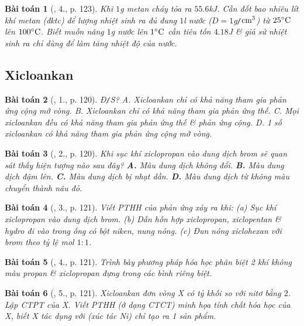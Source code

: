 \documentclass{article}
\newtheorem{baitoan}{Bài toán}
\begin{document}
\begin{baitoan}[\cite{SGK_Hoa_Hoc_11_co_ban}, 4., p. 123]
	Khi $1$\emph{g} metan cháy tỏa ra $55.6$\emph{kJ}. Cần đốt bao nhiêu lít khí metan (đktc) để lượng nhiệt sinh ra đủ đung $1$\emph{l} nước ($D = 1$\emph{g\texttt{/}$\rm cm^3$}) từ $25^\circ{\rm C}$ lên $100^\circ{\rm C}$. Biết muốn nâng $1$\emph{g} nước lên $1^\circ{\rm C}$ cần tiêu tốn $4.18$\emph{J} \& giả sử nhiệt sinh ra chỉ dùng để làm tăng nhiệt độ của nước.
\end{baitoan}


\subsection{Xicloankan}

\begin{baitoan}[\cite{SGK_Hoa_Hoc_11_co_ban}, 1., p. 120]
	\emph{Đ\texttt{/}S}? {\sf A.} Xicloankan chỉ có khả năng tham gia phản ứng cộng mở vòng. {\sf B.} Xicloankan chỉ có khả năng tham gia phản ứng thế. {\sf C.} Mọi xicloankan đều có khả năng tham gia phản ứng thế \& phản ứng cộng. {\sf D.} 1 số xicloankan có khả năng tham gia phản ứng cộng mở vòng.
\end{baitoan}

\begin{baitoan}[\cite{SGK_Hoa_Hoc_11_co_ban}, 2., p. 120]
	Khi sục khí xiclopropan vào dung dịch brom sẽ quan sát thấy hiện tượng nào sau đây? {\bf A.} Màu dung dịch không đổi. {\bf B.} Màu dung dịch đậm lên. {\bf C.} Màu dung dịch bị nhạt dần. {\bf D.} Màu dung dịch từ không màu chuyển thành nâu đỏ.
\end{baitoan}

\begin{baitoan}[\cite{SGK_Hoa_Hoc_11_co_ban}, 3., p. 121]
	Viết PTHH của phản ứng xảy ra khi: (a) Sục khí xiclopropan vào dung dịch brom. (b) Dẫn hỗn hợp xiclopropan, xiclopentan \& hydro đi vào trong ống có bột niken, nung nóng. (c) Đun nóng xiclohexan với brom theo tỷ lệ mol $1:1$.
\end{baitoan}

\begin{baitoan}[\cite{SGK_Hoa_Hoc_11_co_ban}, 4., p. 121]
	Trình bày phương pháp hóa học phân biệt 2 khí không màu propan \& xiclopropan đựng trong các bình riêng biệt.
\end{baitoan}

\begin{baitoan}[\cite{SGK_Hoa_Hoc_11_co_ban}, 5., p. 121]
	Xicloankan đơn vòng X có tỷ khối so với nitơ bằng $2$. Lập CTPT của X. Viết PTHH (ở dạng CTCT) minh họa tính chất hóa học của X, biết X tác dụng với \emph{} (xúc tác \emph{Ni}) chỉ tạo ra 1 sản phẩm.
\end{baitoan}
\end{document}
